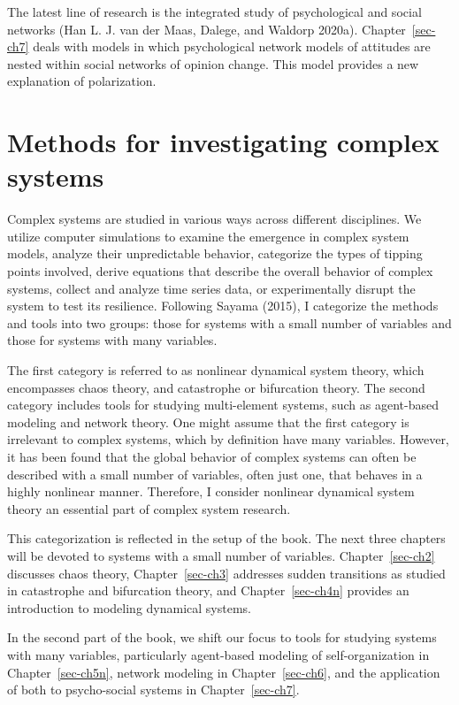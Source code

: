 \documentclass[
  a4paper,
  DIV=11,
  numbers=noendperiod,
  oneside]{scrreprt}
\begin{document}
The latest line of research is the integrated study of psychological and
social networks (Han L. J. van der Maas, Dalege, and Waldorp 2020a).
Chapter~\ref{sec-ch7} deals with models in which psychological network
models of attitudes are nested within social networks of opinion change.
This model provides a new explanation of polarization.

\hypertarget{sec-Methods-for-Investigating-complex-systems}{%
\section{Methods for investigating complex
systems}\label{sec-Methods-for-Investigating-complex-systems}}

Complex systems are studied in various ways across different
disciplines. We utilize computer simulations to examine the emergence in
complex system models, analyze their unpredictable behavior, categorize
the types of tipping points involved, derive equations that describe the
overall behavior of complex systems, collect and analyze time series
data, or experimentally disrupt the system to test its resilience.
Following Sayama (2015), I categorize the methods and tools into two
groups: those for systems with a small number of variables and those for
systems with many variables.

The first category is referred to as nonlinear dynamical system theory,
which encompasses chaos theory, and catastrophe or bifurcation theory.
The second category includes tools for studying multi-element systems,
such as agent-based modeling and network theory. One might assume that
the first category is irrelevant to complex systems, which by definition
have many variables. However, it has been found that the global behavior
of complex systems can often be described with a small number of
variables, often just one, that behaves in a highly nonlinear manner.
Therefore, I consider nonlinear dynamical system theory an essential
part of complex system research.

This categorization is reflected in the setup of the book. The next
three chapters will be devoted to systems with a small number of
variables. Chapter~\ref{sec-ch2} discusses chaos theory,
Chapter~\ref{sec-ch3} addresses sudden transitions as studied in
catastrophe and bifurcation theory, and Chapter~\ref{sec-ch4n} provides
an introduction to modeling dynamical systems.

In the second part of the book, we shift our focus to tools for studying
systems with many variables, particularly agent-based modeling of
self-organization in Chapter~\ref{sec-ch5n}, network modeling in
Chapter~\ref{sec-ch6}, and the application of both to psycho-social
systems in Chapter~\ref{sec-ch7}.
\end{document}

